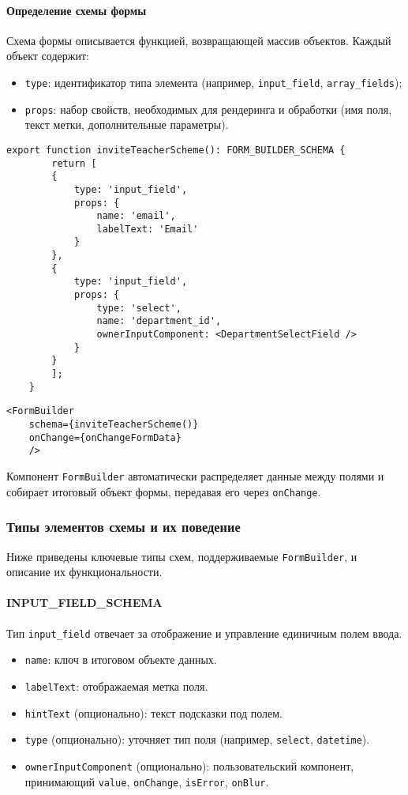 \paragraph{Определение схемы формы}
Схема формы описывается функцией, возвращающей массив объектов. Каждый объект содержит:
\begin{itemize}
	\item \texttt{type}: идентификатор типа элемента (например, \texttt{input\_field}, \texttt{array\_fields});
	\item \texttt{props}: набор свойств, необходимых для рендеринга и обработки (имя поля, текст метки, дополнительные параметры).
\end{itemize}

\begin{lstlisting}[caption=Пример описания схемы формы]
	export function inviteTeacherScheme(): FORM_BUILDER_SCHEMA {
		return [
		{
			type: 'input_field',
			props: {
				name: 'email',
				labelText: 'Email'
			}
		},
		{
			type: 'input_field',
			props: {
				type: 'select',
				name: 'department_id',
				ownerInputComponent: <DepartmentSelectField />
			}
		}
		];
	}
\end{lstlisting}

\begin{lstlisting}[caption=Использование \texttt{FormBuilder}]
	<FormBuilder
	schema={inviteTeacherScheme()}
	onChange={onChangeFormData}
	/>
\end{lstlisting}

Компонент \texttt{FormBuilder} автоматически распределяет данные между полями и собирает итоговый объект формы, передавая его через \texttt{onChange}.

\subsubsection{Типы элементов схемы и их поведение}
Ниже приведены ключевые типы схем, поддерживаемые \texttt{FormBuilder}, и описание их функциональности.

\paragraph{INPUT\_FIELD\_SCHEMA}
Тип \texttt{input\_field} отвечает за отображение и управление единичным полем ввода.
\begin{itemize}
	\item \texttt{name}: ключ в итоговом объекте данных.
	\item \texttt{labelText}: отображаемая метка поля.
	\item \texttt{hintText} (опционально): текст подсказки под полем.
	\item \texttt{type} (опционально): уточняет тип поля (например, \texttt{select}, \texttt{datetime}).
	\item \texttt{ownerInputComponent} (опционально): пользовательский компонент, принимающий \texttt{value}, \texttt{onChange}, \texttt{isError}, \texttt{onBlur}.
\end{itemize}


